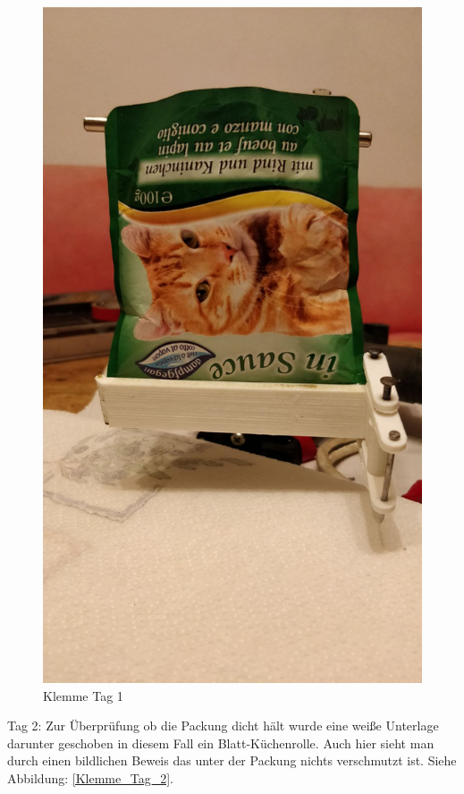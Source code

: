 \begin{figure}[H]
\begin{minipage}[hbt]{.3\linewidth}
      \includegraphics[width=\linewidth]{Bilder/Dichtheitsexperiment/Tag_1}
      \caption{Klemme Tag 1}
      \label{Klemme_Tag_1}
   \end{minipage}
\end{figure}

Tag 2: Zur Überprüfung ob die Packung dicht hält wurde eine weiße Unterlage darunter geschoben in diesem Fall ein Blatt-Küchenrolle. Auch hier sieht man durch einen bildlichen Beweis das unter der Packung nichts verschmutzt ist. Siehe Abbildung: \ref{Klemme_Tag_2}. \\

